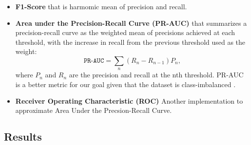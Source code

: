 \begin{itemize}
    \item \textbf{F1-Score} that is harmomic mean of precision and recall.
    \item \textbf{Area under the Precision-Recall Curve (PR-AUC)} that summarizes a precision-recall curve as the weighted mean of precisions achieved at each threshold, with the increase in recall from the previous threshold used as the weight:
    \[ \texttt{PR-AUC} = \sum_n{(R_n - R_{n-1})}{P_n}, \]
    where $P_n$ and $R_n$ are the precision and recall at the nth threshold. PR-AUC is a better metric for our goal given that the dataset is class-imbalanced \cite{article:precision-recall-plot}.
    \item \textbf{Receiver Operating Characteristic (ROC)} Another implementation to approximate Area Under the Precsion-Recall Curve.
\end{itemize}

\subsection{Results}

